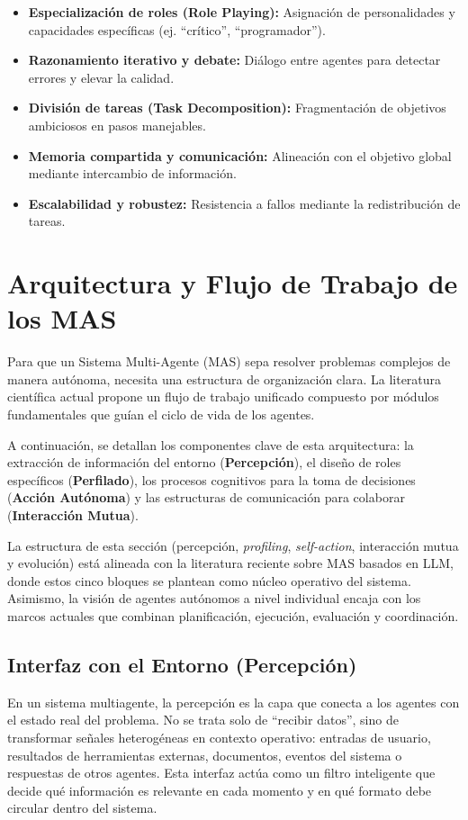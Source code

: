 \documentclass[12pt,a4paper]{article}
\begin{document}
\begin{itemize}
    \item \textbf{Especialización de roles (Role Playing):} Asignación de personalidades y capacidades específicas (ej. ``crítico'', ``programador'').
    \item \textbf{Razonamiento iterativo y debate:} Diálogo entre agentes para detectar errores y elevar la calidad.
    \item \textbf{División de tareas (Task Decomposition):} Fragmentación de objetivos ambiciosos en pasos manejables.
    \item \textbf{Memoria compartida y comunicación:} Alineación con el objetivo global mediante intercambio de información.
    \item \textbf{Escalabilidad y robustez:} Resistencia a fallos mediante la redistribución de tareas.
\end{itemize}

\section{Arquitectura y Flujo de Trabajo de los MAS}
Para que un Sistema Multi-Agente (MAS) sepa resolver problemas complejos de manera autónoma, necesita una estructura de organización clara. La literatura científica actual propone un flujo de trabajo unificado compuesto por módulos fundamentales que guían el ciclo de vida de los agentes.

A continuación, se detallan los componentes clave de esta arquitectura: la extracción de información del entorno (\textbf{Percepción}), el diseño de roles específicos (\textbf{Perfilado}), los procesos cognitivos para la toma de decisiones (\textbf{Acción Autónoma}) y las estructuras de comunicación para colaborar (\textbf{Interacción Mutua}).


La estructura de esta sección (percepción, \textit{profiling}, \textit{self-action}, interacción mutua y evolución) está alineada con la literatura reciente sobre MAS basados en LLM, donde estos cinco bloques se plantean como núcleo operativo del sistema. Asimismo, la visión de agentes autónomos a nivel individual encaja con los marcos actuales que combinan planificación, ejecución, evaluación y coordinación.

\subsection{Interfaz con el Entorno (Percepción)}
En un sistema multiagente, la percepción es la capa que conecta a los agentes con el estado real del problema. No se trata solo de ``recibir datos'', sino de transformar señales heterogéneas en contexto operativo: entradas de usuario, resultados de herramientas externas, documentos, eventos del sistema o respuestas de otros agentes. Esta interfaz actúa como un filtro inteligente que decide qué información es relevante en cada momento y en qué formato debe circular dentro del sistema.
\end{document}
